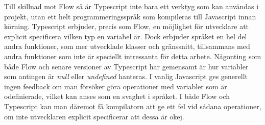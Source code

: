 Till skillnad mot Flow så är Typescript inte bara ett verktyg som kan användas i projekt, utan ett helt programmeringsspråk som kompileras till Javascript innan körning. Typescript erbjuder, precis som Flow, en möjlighet för utvecklare att explicit specificera vilken typ en variabel är. Dock erbjuder språket en hel del andra funktioner, som mer utvecklade klasser och gränssnitt, tillsammans med andra funktioner som inte är speciellt intressanta för detta arbete.
Någonting som både Flow och senare versioner av Typescript har gemensamt är hur variabler som antingen är \textit{null} eller \textit{undefined} hanteras. I vanlig Javascript ges generellt ingen feedback om man försöker göra operationer med variabler som är odefinierade, vilket kan anses som en svaghet i språket. I både Flow och Typescript kan man däremot få kompilatorn att ge ett fel vid sådana operationer, om inte utvecklaren explicit specificerar att dessa är okej.

